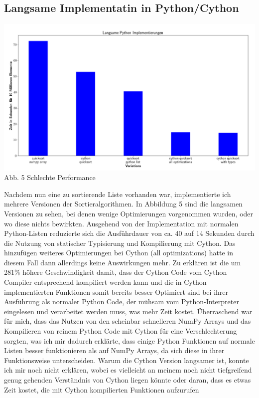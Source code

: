 \documentclass[10pt,a4paper]{article}
\begin{document}
\subsection{Langsame Implementatin in Python/Cython}

\begin{center}
    \hspace*{-1.5cm}\includegraphics[width=1.2\textwidth]{./diagramme/matplotlib/pythonlangsam.png}
    Abb. 5 Schlechte Performance
\end{center}

Nachdem nun eine zu sortierende Liste vorhanden war, implementierte ich mehrere Versionen der Sortieralgorithmen.
In Abbildung 5 sind die langsamen Versionen zu sehen, bei denen wenige Optimierungen vorgenommen wurden, oder wo diese nichts bewirkten.
Ausgehend von der Implementation mit normalen Python-Listen reduzierte sich die Ausführdauer von ca. 40 auf 14 Sekunden
durch die Nutzung von statischer Typisierung und Kompilierung mit Cython. Das hinzufügen weiteres Optimierungen
bei Cython (all optimizations) hatte in diesem Fall dann allerdings keine Auswirkungen mehr.
Zu erklären ist die um 281\% höhere Geschwindigkeit damit, dass der Cython Code vom Cython Compiler
entsprechend kompiliert werden kann und die in Cython implementierten Funktionen somit bereits besser
Optimiert sind bei ihrer Ausführung als normaler Python Code, der mühsam vom Python-Interpreter eingelesen
und verarbeitet werden muss, was mehr Zeit kostet.
Überraschend war für mich, dass das Nutzen von den scheinbar schnelleren NumPy Arrays und das Kompilieren
von reinem Python Code mit Cython für eine Verschlechterung sorgten, was ich mir dadurch erklärte, dass einige
Python Funktionen auf normale Listen besser funktionieren als auf NumPy Arrays, da sich diese in ihrer Funktionsweise
unterscheiden. Warum die Cython Version langsamer ist, konnte ich mir noch nicht erklären, wobei es vielleicht an meinem
noch nicht tiefgreifend genug gehenden Verständnis von Cython liegen könnte oder daran, dass es etwas Zeit kostet,
die mit Cython kompilierten Funktionen aufzurufen
\end{document}
